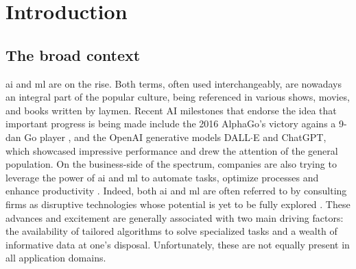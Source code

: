 \cleardoublepage
\chapter{Introduction}

\section{The broad context}

\Ac{ai} and \ac{ml} are on the rise. Both terms, often used interchangeably, are nowadays an integral part of the popular culture, being referenced in various shows, movies, and books written by laymen. Recent AI milestones that endorse the idea that important progress is being made include the 2016 AlphaGo's victory agains a 9-dan Go player \citep{silver2016mastering}, and the OpenAI generative models DALL$\cdot$E and ChatGPT, which showcased impressive performance and drew the attention of the general population. On the business-side of the spectrum, companies are also trying to leverage the power of \ac{ai} and \ac{ml} to automate tasks, optimize processes and enhance productivity \citep{Chui2022}. Indeed, both \ac{ai} and \ac{ml} are often referred to by consulting firms as disruptive technologies whose potential is yet to be fully explored \citep{Bechtel2022}. These advances and excitement are generally associated with two main driving factors: 
the availability of tailored algorithms to solve specialized tasks and a wealth of informative data at one's disposal.
Unfortunately, these are not equally present in all application domains.

